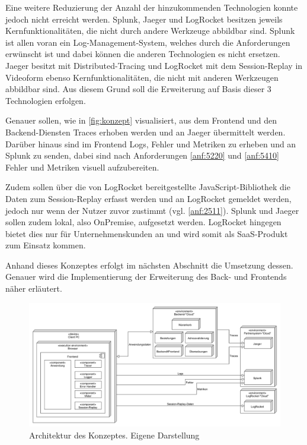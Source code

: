 Eine weitere Reduzierung der Anzahl der hinzukommenden Technologien konnte jedoch nicht erreicht werden. Splunk, Jaeger und LogRocket besitzen jeweils Kernfunktionalitäten, die nicht durch andere Werkzeuge abbildbar sind. Splunk ist allen voran ein Log-Management-System, welches durch die Anforderungen erwünscht ist und dabei können die anderen Technologien es nicht ersetzen. Jaeger besitzt mit Distributed-Tracing und LogRocket mit dem Session-Replay in Videoform ebenso Kernfunktionalitäten, die nicht mit anderen Werkzeugen abbildbar sind. Aus diesem Grund soll die Erweiterung auf Basis dieser 3 Technologien erfolgen.

Genauer sollen, wie in \autoref{fig:konzept} visualisiert, aus dem Frontend und den Backend-Diensten Traces erhoben werden und an Jaeger übermittelt werden. Darüber hinaus sind im Frontend Logs, Fehler und Metriken zu erheben und an Splunk zu senden, dabei sind nach Anforderungen \ref*{anf:5220} und \ref*{anf:5410} Fehler und Metriken visuell aufzubereiten.

Zudem sollen über die von LogRocket bereitgestellte JavaScript-Bibliothek die Daten zum Session-Replay erfasst werden und an LogRocket gemeldet werden, jedoch nur wenn der Nutzer zuvor zustimmt (vgl. \autoref{anf:2511}). Splunk und Jaeger sollen zudem lokal, also OnPremise, aufgesetzt werden. LogRocket hingegen bietet dies nur für Unternehmenskunden an und wird somit als SaaS-Produkt zum Einsatz kommen.

Anhand dieses Konzeptes erfolgt im nächsten Abschnitt die Umsetzung dessen. Genauer wird die Implementierung der Erweiterung des Back- und Frontends näher erläutert.

\begin{figure}[H]
	\centering
	\includegraphics[width=\linewidth]{img/04_erstellung-poc/konzept.png}
	\caption{Architektur des Konzeptes. Eigene Darstellung}
	\label{fig:konzept}
\end{figure}

\vspace{-1\baselineskip}